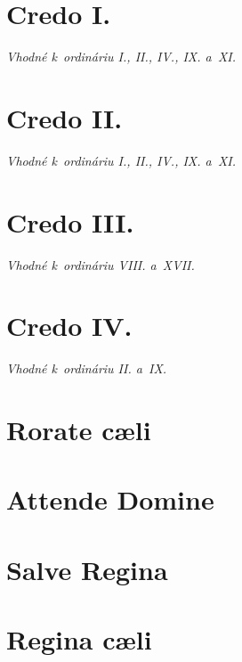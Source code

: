 \documentclass[12pt]{article} %
\newcommand{\info}[2]{{\textsc{#1}\hfill{\em #2}}\par\vspace{1em}}
\begin{document}
\section{Credo I.}
\info{}{Vhodné k~ordináriu I., II., IV., IX. a~XI.}




\section{Credo II.}
\info{}{Vhodné k~ordináriu I., II., IV., IX. a~XI.}




\section{Credo III.}
\info{}{Vhodné k~ordináriu VIII. a~XVII.}




\section{Credo IV.}
\info{}{Vhodné k~ordináriu II. a~IX.}



\newpage



\section{Rorate c\ae{}li}


\section{Attende Domine}
\vspace{0.5em}



\section{Salve Regina}


\section{Regina c\ae{}li}
\vspace{0.5em}

\end{document}
